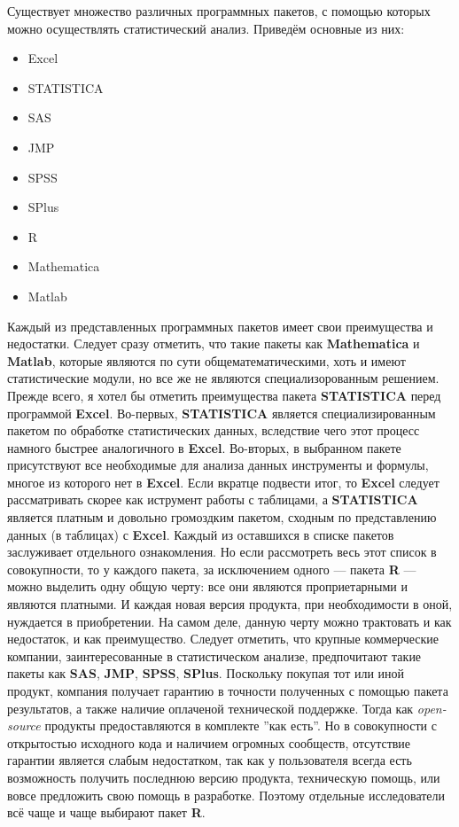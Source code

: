 Существует множество различных программных пакетов, с помощью которых можно осуществлять статистический анализ. Приведём основные из них:
\begin{itemize}
	\item Excel
	\item STATISTICA
	\item SAS
	\item JMP
	\item SPSS
	\item SPlus
	\item R
	\item Mathematica
	\item Matlab
\end{itemize}
Каждый из представленных программных пакетов имеет свои преимущества и недостатки. Следует сразу отметить, что такие пакеты как \textbf{Mathematica} и \textbf{Matlab}, которые являются по сути общематематическими, хоть и имеют статистические модули, но все же не являются специализорованным решением. Прежде всего, я хотел бы отметить преимущества пакета \textbf{STATISTICA} перед программой \textbf{Excel}. Во-первых, \textbf{STATISTICA} является специализированным пакетом по обработке статистических данных, вследствие чего этот процесс намного быстрее аналогичного в \textbf{Excel}. Во-вторых, в выбранном пакете присутствуют все необходимые для анализа данных инструменты и формулы, многое из которого нет в \textbf{Excel}. Если вкратце подвести итог, то \textbf{Excel} следует рассматривать скорее как иструмент работы с таблицами, а \textbf{STATISTICA} является платным и довольно громоздким пакетом, сходным по представлению данных (в таблицах) с \textbf{Excel}. Каждый из оставшихся в списке пакетов заслуживает отдельного ознакомления. Но если рассмотреть весь этот список в совокупности, то у каждого пакета, за исключением одного --- пакета \textbf{R} --- можно выделить одну общую черту: все они являются проприетарными и являются платными. И каждая новая версия продукта, при необходимости в оной, нуждается в приобретении. На самом деле, данную черту можно трактовать и как недостаток, и как преимущество. Следует отметить, что крупные коммерческие компании, заинтересованные в статистическом анализе, предпочитают такие пакеты как \textbf{SAS}, \textbf{JMP}, \textbf{SPSS}, \textbf{SPlus}. Поскольку покупая тот или иной продукт, компания получает гарантию в точности полученных с помощью пакета результатов, а также наличие оплаченой технической поддержке. Тогда как \textit{open-source} продукты предоставляются в комплекте ''как есть''. Но в совокупности с открытостью исходного кода и наличием огромных сообществ, отсутствие гарантии является слабым недостатком, так как у пользователя всегда есть возможность получить последнюю версию продукта, техническую помощь, или вовсе предложить свою помощь в разработке. Поэтому отдельные исследователи всё чаще и чаще выбирают пакет \textbf{R}.

